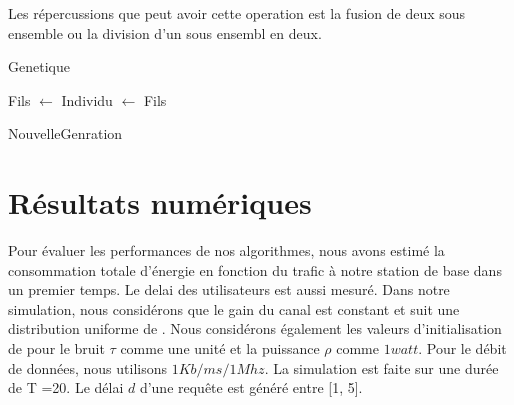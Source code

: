 \documentclass[runningheads]{llncs}
\begin{document}
Les répercussions que peut avoir cette operation est la fusion de 
deux sous ensemble ou la division d'un sous ensembl en deux.

\begin{algorithm}[H]
    \caption{Genetique}%
    \label{alg:genetic}
    \begin{algorithmic}[1]
                \State Fils $ \gets  $
                \State Individu $\gets $ Fils
                \EndIf{}
            \EndFor{}
        \EndWhile{}

    \State {}
    
    \end{algorithmic}
\end{algorithm}
\begin{algorithm}[H]
    \caption{NouvelleGenration}%
    \label{alg:ngeneration}
    \begin{algorithmic}[1]
    \State {}
    
    \end{algorithmic}
\end{algorithm}



\section{R\'esultats num\'eriques}
Pour évaluer les performances de nos algorithmes, nous avons estimé la 
consommation totale d'énergie en fonction du trafic à notre station de 
base dans un premier temps. Le delai des utilisateurs est aussi mesur\'e.
Dans notre simulation, nous considérons que le gain du canal est constant 
et suit une distribution uniforme de \cite{huang2016}.
Nous considérons également les valeurs d'initialisation de \cite{huang2016} 
pour le bruit $ \tau $ comme une unité et la puissance $ \rho $ comme 
$ 1 watt $. Pour le débit de données, nous utilisons $1Kb/ms/1Mhz$.
La simulation est faite sur une durée de T =20. 
Le délai $d$ d'une requête est généré entre [1, 5].
\end{document}
